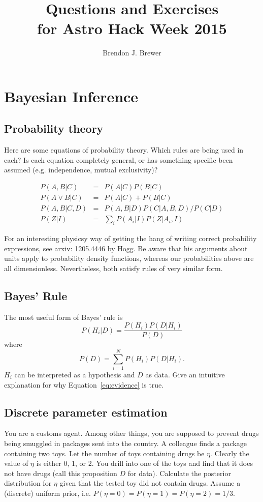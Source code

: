 \documentclass[a4paper, 11pt]{article}
\title{Questions and Exercises\\
for Astro Hack Week 2015}
\author{Brendon J. Brewer}
\begin{document}
\maketitle

\section{Bayesian Inference}


\subsection{Probability theory}
Here are some equations of probability theory. Which rules are being used in
each? Is each equation completely general, or has something specific been
assumed (e.g. independence, mutual exclusivity)?

\begin{eqnarray}
P(A, B | C) &=& P(A | C) P (B | C)\\
P(A \vee B | C) &=& P(A | C) + P(B | C)\\
P(A, B | C, D) &=& P(A, B | D)P(C | A, B, D)/P(C | D)\\
P(Z | I) &=& \sum_i P(A_i | I)P(Z | A_i, I)
\end{eqnarray}

For an interesting physicsy way of getting the hang of writing correct
probability expressions, see arxiv: 1205.4446 by Hogg. Be aware that his
arguments about units apply to probability density functions, whereas
our probabilities above are all dimensionless. Nevertheless, both satisfy rules
of very similar form.


\subsection{Bayes' Rule}
The most useful form of Bayes' rule is
\begin{equation}
P(H_i | D) = \frac{P(H_i)P(D|H_i)}{P(D)}
\end{equation}
where
\begin{equation}
P(D) = \sum_{i=1}^N P(H_i)P(D|H_i).\label{eq:evidence}
\end{equation}
$H_i$ can be interpreted as a hypothesis and $D$ as data.
Give an intuitive explanation for why Equation~\ref{eq:evidence} is true.

\subsection{Discrete parameter estimation}
You are a customs agent. Among other things, you are supposed to prevent
drugs being smuggled in packages sent into the country. A colleague finds a
package containing two toys. Let the number of toys containing drugs be
$\eta$. Clearly the value of $\eta$ is either 0, 1, or 2. You drill into
one of the toys and find that it does not have drugs (call this proposition
$D$ for data).
Calculate the posterior distribution for $\eta$ given that the tested
toy did not contain drugs. Assume a (discrete) uniform prior, i.e.
$P(\eta=0) = P(\eta=1) = P(\eta=2) = 1/3$.
\end{document}
